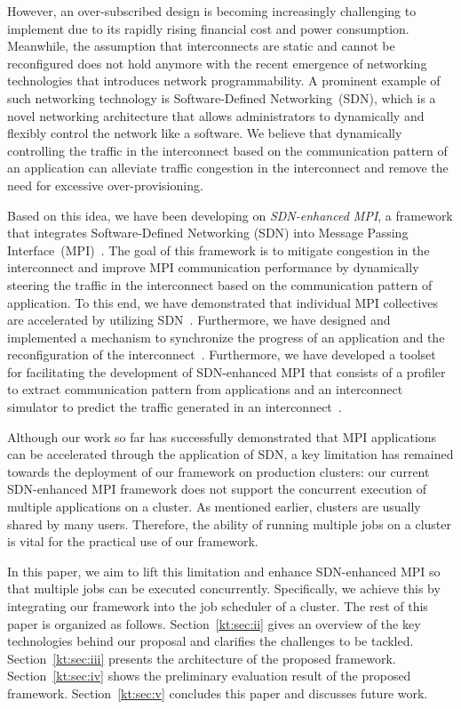 \documentclass[graybox]{svmult}
\begin{document}
However, an over-subscribed design is becoming increasingly challenging to
implement due to its rapidly rising financial cost and power consumption.
Meanwhile, the assumption that interconnects are static and cannot be
reconfigured does not hold anymore with the recent emergence of networking
technologies that introduces network programmability. A prominent example of
such networking technology is Software-Defined Networking~(SDN), which is a
novel networking architecture that allows administrators to dynamically and
flexibly control the network like a software. We believe that dynamically
controlling the traffic in the interconnect based on the communication pattern
of an application can alleviate traffic congestion in the interconnect and
remove the need for excessive over-provisioning.

Based on this idea, we have been developing on \textit{SDN-enhanced MPI}, a
framework that integrates Software-Defined Networking (SDN) into Message
Passing Interface~(MPI)~\cite{MPIForum2012}. The goal of this framework is to
mitigate congestion in the interconnect and improve MPI communication
performance by dynamically steering the traffic in the interconnect based on
the communication pattern of application. To this end, we have demonstrated
that individual MPI collectives are accelerated by utilizing
SDN~\cite{Dashdavaa2014,Takahashi2014}. Furthermore, we have designed and
implemented a mechanism to synchronize the progress of an application and the
reconfiguration of the interconnect~\cite{Takahashi2015,Takahashi2018}.
Furthermore, we have developed a toolset for facilitating the development of
SDN-enhanced MPI that consists of a profiler to extract communication pattern
from applications and an interconnect simulator to predict the traffic
generated in an interconnect~\cite{Takahashi2017}.

Although our work so far has successfully demonstrated that MPI applications
can be accelerated through the application of SDN, a key limitation has
remained towards the deployment of our framework on production clusters: our
current SDN-enhanced MPI framework does not support the concurrent execution
of multiple applications on a cluster. As mentioned earlier, clusters are
usually shared by many users. Therefore, the ability of running multiple jobs
on a cluster is vital for the practical use of our framework.

In this paper, we aim to lift this limitation and enhance SDN-enhanced MPI so
that multiple jobs can be executed concurrently. Specifically, we achieve this
by integrating our framework into the job scheduler of a cluster. The rest of
this paper is organized as follows. Section~\ref{kt:sec:ii} gives an overview
of the key technologies behind our proposal and clarifies the challenges to be
tackled. Section~\ref{kt:sec:iii} presents the architecture of the proposed
framework. Section~\ref{kt:sec:iv} shows the preliminary evaluation result of
the proposed framework. Section~\ref{kt:sec:v} concludes this paper and
discusses future work.
\end{document}
